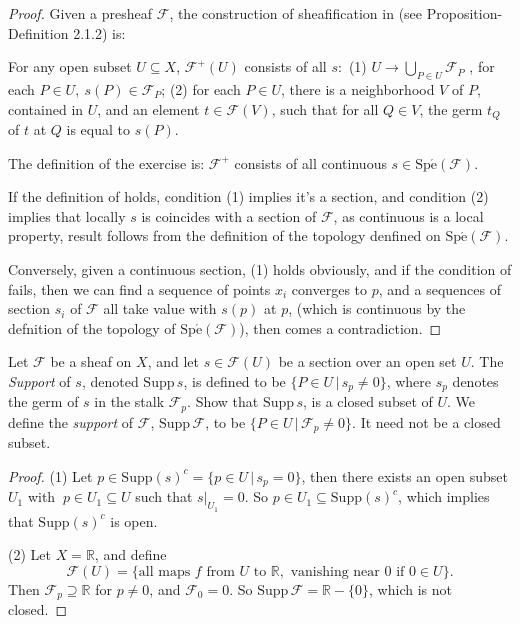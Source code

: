 \begin{proof}
	Given a presheaf $\mathscr{F}$,  the construction of sheafification in \cite{HAR} (see Proposition-Definition 2.1.2) is:
	
	For any open subset $U\subseteq X$, $\mathscr{F}^{+}(U)$ consists of all $s:$ (1) $ U \rightarrow  \bigcup_{P \in U} \mathscr{F}_{P}$ ,  for each $P \in U,\ s(P) \in \mathscr{F}_{P}$; (2) for each $P \in U$, there is a neighborhood $V$ of $P$, contained in $U$, and an element $t \in \mathscr{F}(V)$, such that for all $Q \in V$, the germ $t_{Q}$ of $t$ at $Q$ is equal to $s(P)$.
	
	The definition of the exercise is: $\mathscr{F}^{+}$ consists of all continuous $s\in \operatorname{Sp\acute{e}}(\mathscr{F})$.
	
	If the definition of \cite{HAR} holds,  condition (1) implies it's a section,  and condition (2) implies that locally $s$ is coincides with a section of $\mathscr{F}$,  as continuous is a local property,  result follows from the definition of the topology denfined on $\operatorname{Sp\acute{e}}(\mathscr{F})$.
	
	Conversely,  given a continuous section, (1) holds obviously,  and if the condition of \cite{HAR} fails,  then we can find a sequence of points ${x_{i}}$ converges to $p$,  and a sequences of section ${s_{i}}$ of ${\mathscr{F}}$ all take value with $s(p)$ at $p$,   (which is continuous by the defnition of the topology of $\operatorname{Sp\acute{e}}(\mathscr{F})$),  then comes a contradiction.
\end{proof}
\begin{exe}[Support]
	\label{2.1.14}
	Let $\mathscr{F}$ be a sheaf on $X$, and let $s\in \mathscr{F}(U)$ be a section over an open set $U$.
	The \emph{Support} of $s$, denoted $\mathrm{Supp}\,s$, is defined to be $\{P\in U\,|\, s_p\neq 0\}$, where $s_p$ denotes the germ
	of $s$ in the stalk $\mathscr{F}_p$. Show that $\mathrm{Supp}\,s$, is a closed subset of $U$. We define the \emph{support} of 
	$\mathscr{F}$, $\mathrm{Supp}\,\mathscr{F}$, to be  $\{P\in U\,|\, \mathscr{F}_p\neq 0\}$. It need not be a closed subset.
\end{exe}

\begin{proof}
	(1) Let $p\in \mathrm{Supp}(s)^c=\{p\in U\,|\,s_p=0\}$, then there exists an open subset $U_1$ with $\ p\in U_1\subseteq U$ such that $s|_{U_1}=0$.
	So $p\in U_1\subseteq \mathrm{Supp}(s)^c$, which implies that $\mathrm{Supp}(s)^c$ is open.
	
	
	(2) Let $X=\mathbb{R}$, and define $$\mathscr{F}(U)=\{\mbox{all maps } f \mbox{ from } U \mbox{ to }\mathbb{R}, \mbox{ vanishing near }0 \mbox{ if } 0\in U\}.$$
	Then $\mathscr{F}_p\supseteq\mathbb{R}$ for $p\neq 0$, and $\mathscr{F}_0=0$. So $\mathrm{Supp}\,\mathscr{F}=\mathbb{R}-\{0\}$, which is not closed.
\end{proof}

